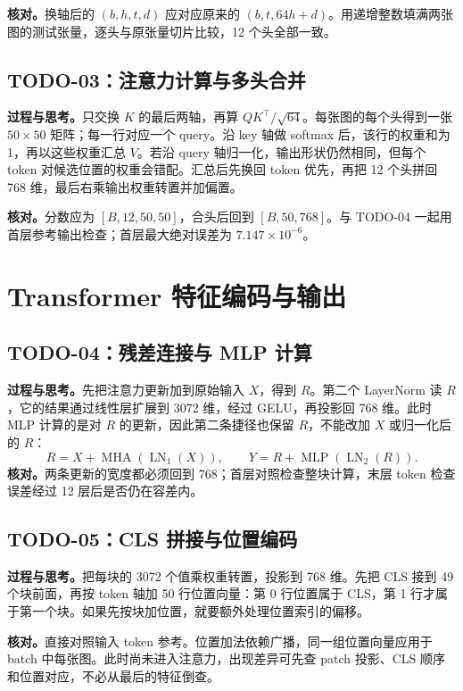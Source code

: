 \documentclass[a4paper,12pt]{article}
\begin{document}
\textbf{核对。}换轴后的 \((b,h,t,d)\) 应对应原来的 \((b,t,64h+d)\)。用递增整数填满两张图的测试张量，逐头与原张量切片比较，12 个头全部一致。

\subsection{TODO-03：注意力计算与多头合并}
\textbf{过程与思考。}只交换 \(K\) 的最后两轴，再算 \(QK^\top/\sqrt{64}\)。每张图的每个头得到一张 \(50\times50\) 矩阵；每一行对应一个 query。沿 key 轴做 softmax 后，该行的权重和为 1，再以这些权重汇总 \(V\)。若沿 query 轴归一化，输出形状仍然相同，但每个 token 对候选位置的权重会错配。汇总后先换回 token 优先，再把 12 个头拼回 768 维，最后右乘输出权重转置并加偏置。

\textbf{核对。}分数应为 \([B,12,50,50]\)，合头后回到 \([B,50,768]\)。与 TODO-04 一起用首层参考输出检查；首层最大绝对误差为 \(7.147\times10^{-6}\)。

\newpage
\section{Transformer 特征编码与输出}

\subsection{TODO-04：残差连接与 MLP 计算}
\textbf{过程与思考。}先把注意力更新加到原始输入 \(X\)，得到 \(R\)。第二个 LayerNorm 读 \(R\)，它的结果通过线性层扩展到 3072 维，经过 GELU，再投影回 768 维。此时 MLP 计算的是对 \(R\) 的更新，因此第二条捷径也保留 \(R\)，不能改加 \(X\) 或归一化后的 \(R\)：
\[
R=X+\operatorname{MHA}(\operatorname{LN}_1(X)),\qquad
Y=R+\operatorname{MLP}(\operatorname{LN}_2(R)).
\]
\textbf{核对。}两条更新的宽度都必须回到 768；首层对照检查整块计算，末层 token 检查误差经过 12 层后是否仍在容差内。

\subsection{TODO-05：CLS 拼接与位置编码}
\textbf{过程与思考。}把每块的 3072 个值乘权重转置，投影到 768 维。先把 CLS 接到 49 个块前面，再按 token 轴加 50 行位置向量：第 0 行位置属于 CLS，第 1 行才属于第一个块。如果先按块加位置，就要额外处理位置索引的偏移。

\textbf{核对。}直接对照输入 token 参考。位置加法依赖广播，同一组位置向量应用于 batch 中每张图。此时尚未进入注意力，出现差异可先查 patch 投影、CLS 顺序和位置对应，不必从最后的特征倒查。
\end{document}
